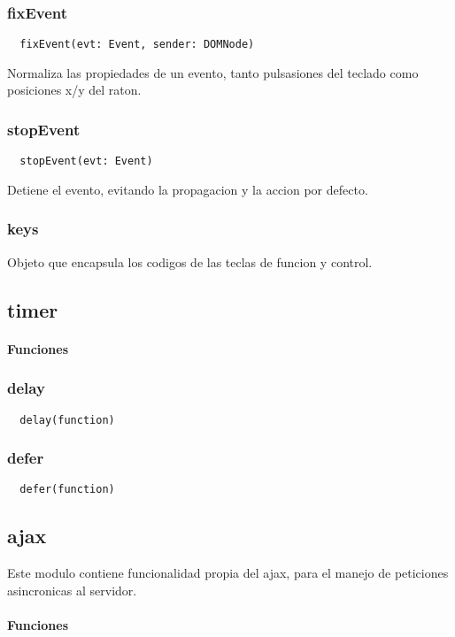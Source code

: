 \subsubsection*{fixEvent}
\begin{verbatim}
  fixEvent(evt: Event, sender: DOMNode)
\end{verbatim}
Normaliza las propiedades de un evento, tanto pulsasiones del teclado como
posiciones x/y del raton.

\subsubsection*{stopEvent}
\begin{verbatim}
  stopEvent(evt: Event)
\end{verbatim}
Detiene el evento, evitando la propagacion y la accion por defecto.

\subsubsection*{keys}
Objeto que encapsula los codigos de las teclas de funcion y control.

\subsection{timer}

\paragraph{Funciones}
\subsubsection*{delay}
\begin{verbatim}
  delay(function)
\end{verbatim}

\subsubsection*{defer}
\begin{verbatim}
  defer(function)
\end{verbatim}

\subsection{ajax}
Este modulo contiene funcionalidad propia del ajax, para el manejo de peticiones
asincronicas al servidor.
\paragraph{Funciones}
